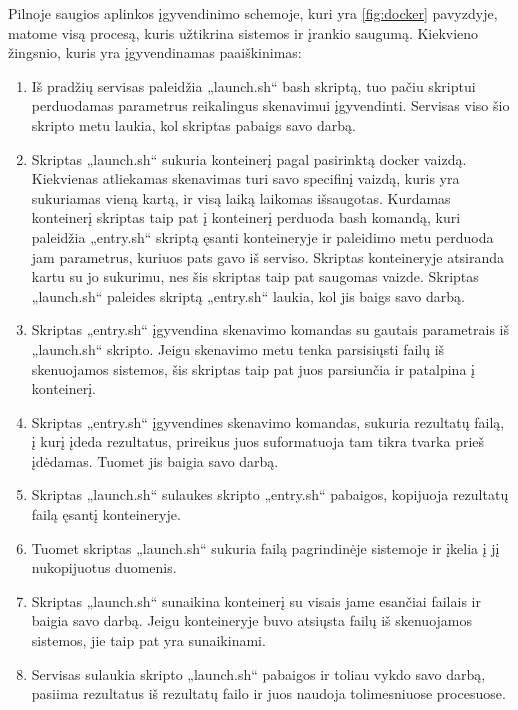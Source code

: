 \documentclass[a4paper,12pt,fleqn]{article}
\begin{document}
Pilnoje saugios aplinkos įgyvendinimo schemoje, kuri yra \ref{fig:docker} pavyzdyje, matome visą procesą, kuris užtikrina sistemos ir įrankio saugumą. Kiekvieno žingsnio, kuris yra įgyvendinamas paaiškinimas:
\begin{enumerate}
	\item Iš pradžių servisas paleidžia „launch.sh“ bash skriptą, tuo pačiu skriptui perduodamas parametrus reikalingus skenavimui įgyvendinti. Servisas viso šio skripto metu laukia, kol skriptas pabaigs savo darbą.
	
	\item Skriptas „launch.sh“ sukuria konteinerį pagal pasirinktą docker vaizdą. Kiekvienas atliekamas skenavimas turi savo specifinį vaizdą, kuris yra sukuriamas vieną kartą, ir visą laiką laikomas išsaugotas.
	Kurdamas konteinerį skriptas taip pat į konteinerį perduoda bash komandą, kuri paleidžia „entry.sh“ skriptą ęsanti konteineryje ir paleidimo metu perduoda jam parametrus, kuriuos pats gavo iš serviso. Skriptas konteineryje atsiranda kartu su jo sukurimu, nes šis skriptas taip pat saugomas vaizde. Skriptas „launch.sh“ paleides skriptą „entry.sh“ laukia, kol jis baigs savo darbą.
	
	\item Skriptas „entry.sh“ įgyvendina skenavimo komandas su gautais parametrais iš „launch.sh“ skripto. Jeigu skenavimo metu tenka parsisiųsti failų iš skenuojamos sistemos, šis skriptas taip pat juos parsiunčia ir patalpina į konteinerį. 
	
	\item Skriptas „entry.sh“ įgyvendines skenavimo komandas, sukuria rezultatų failą, į kurį įdeda rezultatus, prireikus juos suformatuoja tam tikra tvarka prieš įdėdamas. Tuomet jis baigia savo darbą.
	
	\item Skriptas „launch.sh“ sulaukes skripto „entry.sh“ pabaigos, kopijuoja rezultatų failą ęsantį konteineryje.
	
	\item Tuomet skriptas „launch.sh“ sukuria failą pagrindinėje sistemoje ir įkelia į jį nukopijuotus duomenis.
	
	\item Skriptas „launch.sh“ sunaikina konteinerį su visais jame esančiai failais ir baigia savo darbą. Jeigu konteineryje buvo atsiųsta failų iš skenuojamos sistemos, jie taip pat yra sunaikinami.
	
	\item Servisas sulaukia skripto „launch.sh“ pabaigos ir toliau vykdo savo darbą, pasiima rezultatus iš rezultatų failo ir juos naudoja tolimesniuose procesuose.
\end{enumerate} 
\end{document}
